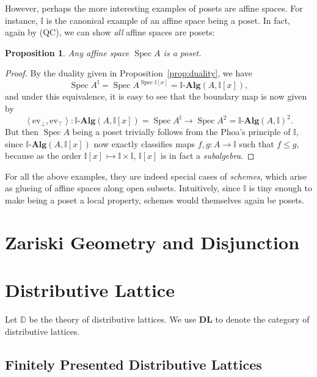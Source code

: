 \documentclass[12pt]{amsart}
\newtheorem{proposition}[theorem]{Proposition}
\theoremstyle{definition}
\newcommand{\mb}[1]{\mathbf{#1}}
\newcommand{\mbb}[1]{\mathbb{#1}}
\newcommand{\I}{\mbb I}
\newcommand{\alg}{\text{-}\mb{Alg}}
\newcommand{\DL}{\mb{DL}}
\newcommand{\pair}[1]{\left\langle#1\right\rangle}
\newcommand{\ev}{\mathrm{ev}}
\newcommand{\inj}{\rightarrowtail}
\newcommand{\spec}{\operatorname{Spec}}
\begin{document}
However, perhaps the more interesting examples of posets are affine spaces. For instance, $\I$ is the canonical example of an affine space being a poset. In fact, again by (QC), we can show \emph{all} affine spaces are posets:

\begin{proposition}
  Any affine space $\spec A$ is a poset.
\end{proposition}
\begin{proof}
  By the duality given in Proposition~\ref{prop:duality}, we have
  \[ \spec A^\I = \spec A^{\spec \I[x]} = \I\alg(A,\I[x]), \]
  and under this equivalence, it is easy to see that the boundary map is now given by
  \[ \pair{\ev_\bot,\ev_\top} : \I\alg(A,\I[x]) = \spec A^\I \to \spec A^2 = \I\alg(A,\I)^2. \]
  But then $\spec A$ being a poset trivially follows from the Phoa's principle of $\I$, since $\I\alg(A,\I[x])$ now exactly classifies maps $f,g : A \to \I$ such that $f \le g$, because as the order $\I[x] \inj \I \times \I$, $\I[x]$ is in fact a \emph{subalgebra}.
\end{proof}

For all the above examples, they are indeed special cases of \emph{schemes}, which arise as glueing of affine spaces along open subsets. Intuitively, since $\I$ is tiny enough to make being a poset a local property, schemes would themselves again be posets. 

\section{Zariski Geometry and Disjunction}








 


\appendix


\section{Distributive Lattice}

Let $\mbb D$ be the theory of distributive lattices. We use $\DL$ to denote the category of distributive lattices. 

\subsection{Finitely Presented Distributive Lattices}
\end{document}
